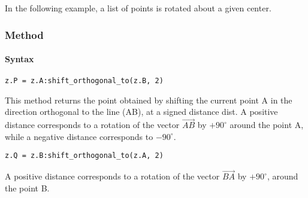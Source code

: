 \medskip
\noindent
In the following example, a list of points is rotated about a given center.

\vspace{1em}

\begin{tkzexample}[latex=7cm]
\begin{center}
\end{center}
\end{tkzexample}

\subsubsection{Method }\label{shift_orthogonal}

\paragraph*{Syntax}

\begin{verbatim}
z.P = z.A:shift_orthogonal_to(z.B, 2)
\end{verbatim}

\medskip
This method returns the point obtained by shifting the current point
A in the direction orthogonal to the line (AB), at a signed distance dist.
A positive distance corresponds to a rotation of the vector $\overrightarrow{AB}$
by $+90^\circ$ around the point A, while a negative distance corresponds to
$-90^\circ$.

\begin{verbatim}
z.Q = z.B:shift_orthogonal_to(z.A, 2)
\end{verbatim}
A positive distance corresponds to a rotation of the vector $\overrightarrow{BA}$
by $+90^\circ$, around the point B.

\begin{tkzexample}[latex=.4\textwidth]
\end{tkzexample}

